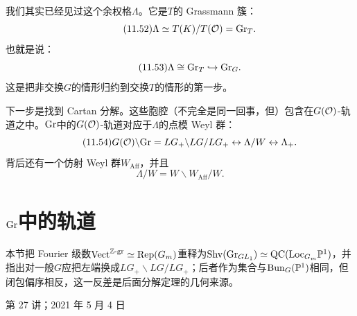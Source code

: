 我们其实已经见过这个余权格$\Lambda$。它是$T$的 Grassmann 簇：
\begin{equation}\tag{11.52}
\Lambda\simeq T(K)/T(\mathcal{O})=\mathrm{Gr}_T.
\end{equation}
也就是说：
\begin{equation}\tag{11.53}
\Lambda\cong\mathrm{Gr}_T\hookrightarrow\mathrm{Gr}_G.
\end{equation}
这是把非交换$G$的情形归约到交换$T$的情形的第一步。

下一步是找到 Cartan 分解。这些胞腔（不完全是同一回事，但）包含在$G(\mathcal{O})$-轨道之中。$\mathrm{Gr}$中的$G(\mathcal{O})$-轨道对应于$\Lambda$的点模 Weyl 群：
\begin{equation}\tag{11.54}
G(\mathcal{O})\backslash\mathrm{Gr}=LG_+\backslash LG/LG_+\leftrightarrow\Lambda/W\leftrightarrow\Lambda_+.
\end{equation}
背后还有一个仿射 Weyl 群$W_{\mathrm{Aff}}$，并且
\begin{equation}\tag{11.55}
\Lambda/W=W\backslash W_{\mathrm{Aff}}/W.
\end{equation}


\section{$\mathrm{Gr}$中的轨道}\label{sec:11-3}

\begin{sectionkey}
本节把 Fourier 级数$\mathrm{Vect}^{\mathbb{Z}\text{-gr}}\simeq\mathrm{Rep}(G_m)$重释为$\mathrm{Shv}(\mathrm{Gr}_{GL_1})\simeq\mathrm{QC}(\mathrm{Loc}_{G_m}\mathbb{P}^1)$，并指出对一般$G$应把左端换成$LG_+\backslash LG/LG_+$；后者作为集合与$\mathrm{Bun}_G(\mathbb{P}^1)$相同，但闭包偏序相反，这一反差是后面分解定理的几何来源。
\end{sectionkey}

\begin{flushright}\small 第 27 讲；2021 年 5 月 4 日\end{flushright}

